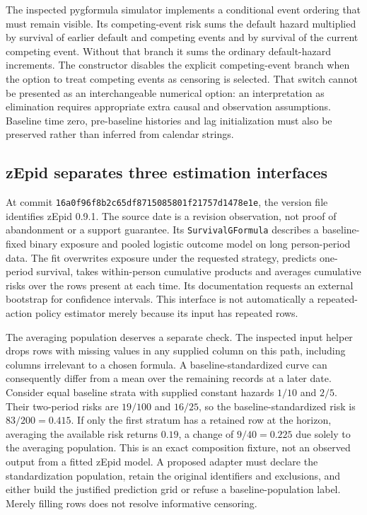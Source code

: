 The inspected pygformula simulator implements a conditional event ordering
that must remain visible. Its competing-event risk sums the default hazard
multiplied by survival of earlier default and competing events and by
survival of the current competing event. Without that branch it sums the
ordinary default-hazard increments. The constructor disables the explicit
competing-event branch when the option to treat competing events as censoring
is selected. That switch cannot be presented as an interchangeable numerical
option: an interpretation as elimination requires appropriate extra causal
and observation assumptions. Baseline time zero, pre-baseline histories and
lag initialization must also be preserved rather than inferred from calendar
strings.\citep{exec24_longpy_pygformula_source}

\subsection{zEpid separates three estimation interfaces}
At commit \texttt{16a0f96f8b2c65df8715085801f21757d1478e1e}, the version file
identifies zEpid 0.9.1. The source date is a revision observation, not proof
of abandonment or a support guarantee. Its \texttt{SurvivalGFormula} describes
a baseline-fixed binary exposure and pooled logistic outcome model on long
person-period data. The fit overwrites exposure under the requested strategy,
predicts one-period survival, takes within-person cumulative products and
averages cumulative risks over the rows present at each time. Its documentation
requests an external bootstrap for confidence intervals. This interface is
not automatically a repeated-action policy estimator merely because its
input has repeated rows.\citep{exec24_longpy_zepid_source}

The averaging population deserves a separate check. The inspected input
helper drops rows with missing values in any supplied column on this path,
including columns irrelevant to a chosen formula. A baseline-standardized
curve can consequently differ from a mean over the remaining records at a
later date. Consider equal baseline strata with supplied constant hazards
$1/10$ and $2/5$. Their two-period risks are $19/100$ and $16/25$, so the
baseline-standardized risk is $83/200=0.415$. If only the first stratum has
a retained row at the horizon, averaging the available risk returns $0.19$,
a change of $9/40=0.225$ due solely to the averaging population. This is an
exact composition fixture, not an observed output from a fitted zEpid model.
A proposed adapter must declare the standardization population, retain the
original identifiers and exclusions, and either build the justified prediction
grid or refuse a baseline-population label. Merely filling rows does not
resolve informative censoring.\citep{exec24_longpy_zepid_source,exec24_longpy_reference}

